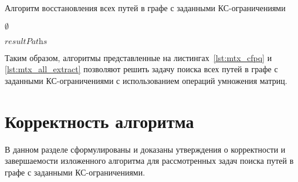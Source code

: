 \begin{algorithm}
	\begin{algorithmic}[1]
		\caption{Алгоритм восстановления всех путей в графе с заданными КС-ограничениями}
		\label{lst:mtx_all_extract}		
		
		\State \Return $\emptyset$
		\EndIf
		
		
		  
		\EndIf
		\EndFor
		\EndIf
		\Else {}
		\EndIf
		\EndFor
		\EndIf
		\EndFor
		\State \Return $\textit{resultPaths}$
		\EndFunction
	\end{algorithmic}
\end{algorithm}

Таким образом, алгоритмы представленные на листингах~\ref{lst:mtx_cfpq} и \ref{lst:mtx_all_extract} позволяют решить задачу поиска всех путей в графе с заданными КС-ограничениями с использованием операций умножения матриц.


\section{Корректность алгоритма}\label{sec:ch3/sect2}
В данном разделе сформулированы и доказаны утверждения о корректности и завершаемости изложенного алгоритма для рассмотренных задач поиска путей в графе с заданными КС-ограничениями.

